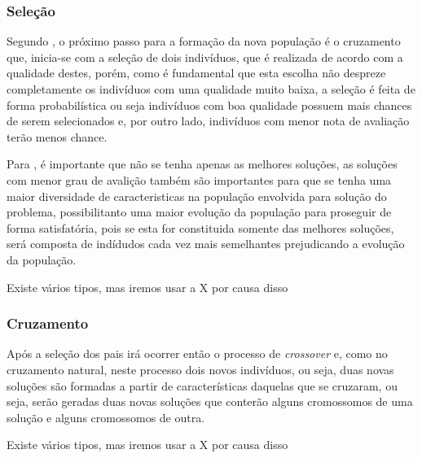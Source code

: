 

\subsubsection{Seleção}

\par Segundo , o próximo passo
para a formação da nova população é o cruzamento que, inicia-se com a seleção de
dois indivíduos, que é realizada de acordo com a qualidade destes, porém,
como é fundamental que esta escolha não despreze completamente os indivíduos com uma
qualidade muito baixa, a seleção é feita de forma probabilística ou seja
indivíduos com boa qualidade possuem mais chances de serem selecionados e, por outro lado,
indivíduos com menor nota de avaliação terão menos chance.

\par Para , é importante que não se tenha
apenas as melhores soluções, as soluções com menor grau de avalição também são
importantes para que se tenha uma maior diversidade de caracteristicas na
população envolvida para solução do problema, possibilitanto uma maior evolução
da população para proseguir de forma satisfatória, pois se esta for
constituida somente das melhores soluções, será composta de indídudos
cada vez mais semelhantes prejudicando a evolução da população. 


Existe vários tipos, mas iremos usar a X por causa disso

\subsubsection{Cruzamento}
\par Após a seleção dos pais irá ocorrer então o processo de \textit{crossover}
e, como no cruzamento natural, neste processo dois novos indivíduos, ou seja, duas
novas soluções são formadas a partir de características daquelas que se
cruzaram, ou seja, serão geradas duas novas soluções que conterão alguns cromossomos
de uma solução e alguns cromossomos de outra.

Existe vários tipos, mas iremos usar a X por causa disso

